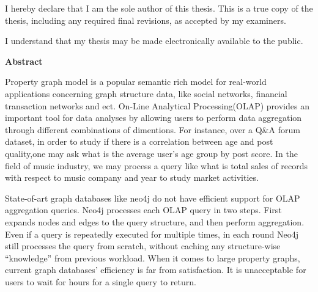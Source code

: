 \cleardoublepage %
 


  \noindent
I hereby declare that I am the sole author of this thesis. This is a true copy of the thesis, including any required final revisions, as accepted by my examiners.

  \bigskip
  
  \noindent
I understand that my thesis may be made electronically available to the public.

\cleardoublepage


\begin{center}\textbf{Abstract}\end{center}

Property graph model is a popular semantic rich model for real-world applications concerning graph structure data, like social networks, financial transaction networks and ect. On-Line Analytical Processing(OLAP) provides an important tool for data analyses by allowing users to perform data aggregation through different combinations of dimentions. For instance, over a Q\&A forum dataset, in order to study if there is a correlation between age and post quality,one may ask what is the average user's age group by post score. In the field of music industry, we may process a query like what is total sales of records with respect to music company and year to study market activities.

State-of-art graph databases like neo4j do not have efficient support for OLAP aggregation queries. Neo4j processes each OLAP query in two steps. First expands nodes and edges to the query structure, and then perform aggregation. Even if a query is repeatedly executed for multiple times, in each round Neo4j still processes the query from scratch, without caching any structure-wise ``knowledge'' from previous workload. When it comes to large property graphs, current graph databases' efficiency is far from satisfaction. It is unacceptable for users to wait for hours for a single query to return. 


